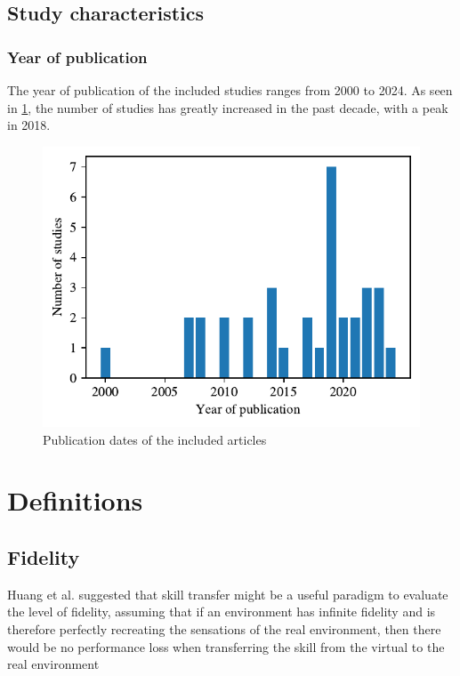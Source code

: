 \subsection{Study characteristics}

\subsubsection{Year of publication}
The year of publication of the included studies ranges from 2000 to 2024. As seen in \ref{fig:years}, the number of studies has greatly increased in the past decade, with a peak in 2018.

\begin{figure}[htbp]
    \centering
    \includegraphics[width=\columnwidth]{figures/years.pdf} 
    \caption{Publication dates of the included articles}
    \label{fig:years}
\end{figure} 

\subsubsection{}


\section{Definitions}
\subsection{Fidelity}
Huang et al. suggested that skill transfer might be a useful paradigm to evaluate the level of fidelity, assuming that if an environment has infinite fidelity and is therefore perfectly recreating the sensations of the real environment, then there would be no performance loss when transferring the skill from the virtual to the real environment \cite{Huang2006}

